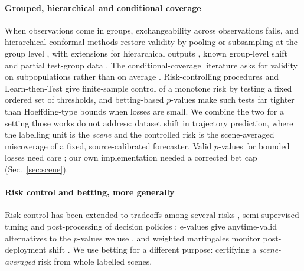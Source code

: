 \paragraph{Grouped, hierarchical and conditional coverage}
When observations come in groups, exchangeability across observations fails, and hierarchical conformal methods restore validity
by pooling or subsampling at the group level \cite{dunn2023hierarchical,lee2023hierarchical}, with extensions for hierarchical
outputs \cite{principato2024hierarchicaldata}, known group-level shift \cite{bhattacharyya2024groupweighted} and partial test-group
data \cite{mallick2026generalizedhcp}. The conditional-coverage literature asks for validity on subpopulations rather than on
average \cite{min2026unifiedtheory,zhou2026cpassessment,braun2025diagnostics,bairaktari2025kandinsky}. Risk-controlling procedures
\cite{bates2021rcps} and Learn-then-Test \cite{angelopoulos2025ltt} give finite-sample control of a monotone risk by testing a
fixed ordered set of thresholds, and betting-based $p$-values \cite{waudbysmith2024betting} make such tests far tighter than
Hoeffding-type bounds when losses are small. We combine the two for a setting those works do not address: dataset shift in
trajectory prediction, where the labelling unit is the \emph{scene} and the controlled risk is the scene-averaged miscoverage
of a fixed, source-calibrated forecaster. Valid $p$-values for bounded losses need care \cite{alvarez2024pvalue}; our own
implementation needed a corrected bet cap (Sec.~\ref{sec:scene}).

\paragraph{Risk control and betting, more generally}
Risk control has been extended to tradeoffs among several risks \cite{nguyen2024tradeoffs}, semi-supervised tuning
\cite{einbinder2024semisupervised} and post-processing of decision policies \cite{joshi2026riskcontrolled}; e-values give
anytime-valid alternatives to the $p$-values we use \cite{gauthier2025evalues}, and weighted martingales monitor
post-deployment shift \cite{prinster2025watch}. We use betting for a different purpose: certifying a \emph{scene-averaged}
risk from whole labelled scenes.

